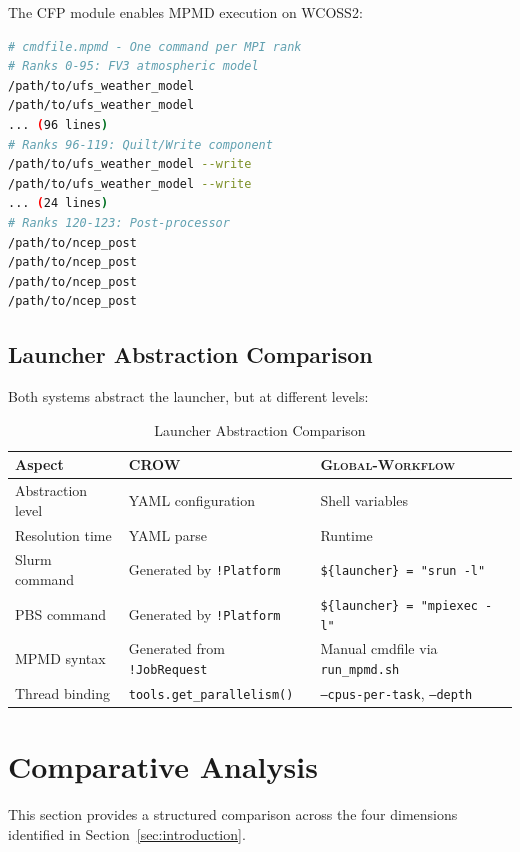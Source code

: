 \documentclass[11pt,twoside]{article}
\newcommand{\crow}{\textsc{CROW}}
\newcommand{\gw}{\textsc{Global-Workflow}}
\newcommand{\mpmd}{\textsc{MPMD}}
\newcommand{\cfp}{\textsc{CFP}}
\begin{document}
The \cfp{} module enables \mpmd{} execution on \textsc{WCOSS2}:

\begin{lstlisting}[language=Bash, caption={CFP Command File Format}]
# cmdfile.mpmd - One command per MPI rank
# Ranks 0-95: FV3 atmospheric model
/path/to/ufs_weather_model
/path/to/ufs_weather_model
... (96 lines)
# Ranks 96-119: Quilt/Write component  
/path/to/ufs_weather_model --write
/path/to/ufs_weather_model --write
... (24 lines)
# Ranks 120-123: Post-processor
/path/to/ncep_post
/path/to/ncep_post
/path/to/ncep_post
/path/to/ncep_post
\end{lstlisting}

\subsection{Launcher Abstraction Comparison}

Both systems abstract the launcher, but at different levels:

\begin{table}[H]
\centering
\caption{Launcher Abstraction Comparison}
\label{tab:launcher-compare}
\begin{tabular}{@{}p{3.2cm}p{4.5cm}p{4.8cm}@{}}
\toprule
\textbf{Aspect} & \textbf{\crow{}} & \textbf{\gw{}} \\
\midrule
Abstraction level & YAML configuration & Shell variables \\
Resolution time & YAML parse & Runtime \\
Slurm command & Generated by \texttt{!Platform} & \texttt{\$\{launcher\} = "srun -l"} \\
PBS command & Generated by \texttt{!Platform} & \texttt{\$\{launcher\} = "mpiexec -l"} \\
MPMD syntax & Generated from \texttt{!JobRequest} & Manual cmdfile via \texttt{run\_mpmd.sh} \\
Thread binding & \texttt{tools.get\_parallelism()} & \texttt{--cpus-per-task}, \texttt{--depth} \\
\bottomrule
\end{tabular}
\end{table}

\section{Comparative Analysis}
\label{sec:comparison}

This section provides a structured comparison across the four dimensions identified in Section~\ref{sec:introduction}.
\end{document}
